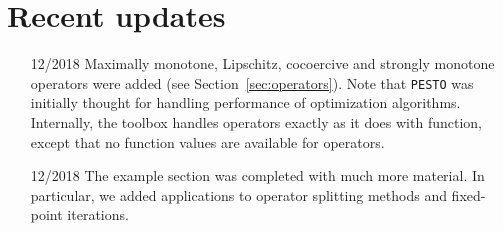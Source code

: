 \documentclass[11pt,a4paper]{article}
\begin{document}
\section*{Recent updates}
\begin{itemize}
	\item[12/2018] Maximally monotone, Lipschitz, cocoercive and strongly monotone operators were added (see Section~\ref{sec:operators}). Note that \verb|PESTO| was initially thought for handling performance of optimization algorithms. Internally, the toolbox handles operators exactly as it does with function, except that no function values are available for operators.
	\item[12/2018] The example section was completed with much more material. In particular, we added applications to operator splitting methods and fixed-point iterations.
\end{itemize}

\clearpage
\end{document}
